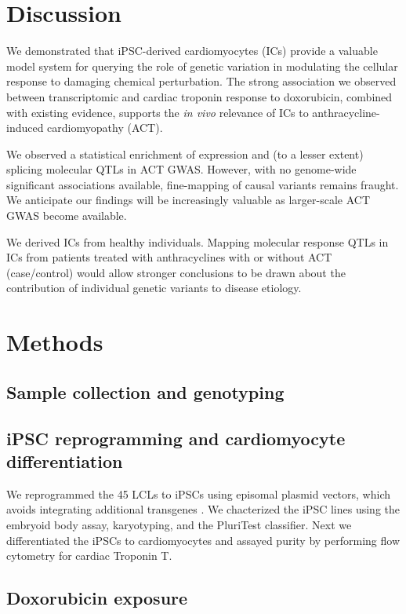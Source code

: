 \documentclass{article}
\begin{document}
{\section*{Discussion}

We demonstrated that iPSC-derived cardiomyocytes (ICs) provide a valuable model system for querying the role of genetic variation in modulating the cellular response to damaging chemical perturbation. The strong association we observed between transcriptomic and cardiac troponin response to doxorubicin, combined with existing evidence\cite{Burridge2016}, supports the \emph{in vivo} relevance of ICs to anthracycline-induced cardiomyopathy (ACT). 

We observed a statistical enrichment of expression and (to a lesser extent) splicing molecular QTLs in ACT GWAS. However, with no genome-wide significant associations available, fine-mapping of causal variants remains fraught. We anticipate our findings will be increasingly valuable as larger-scale ACT GWAS become available. 

We derived ICs from healthy individuals. Mapping molecular response QTLs in ICs from patients treated with anthracyclines with or without ACT (case/control) would allow stronger conclusions to be drawn about the contribution of individual genetic variants to disease etiology. 

\section*{Methods} 

\subsection*{Sample collection and genotyping}

\subsection*{iPSC reprogramming and cardiomyocyte differentiation} 

We reprogrammed the 45 LCLs to iPSCs using episomal plasmid vectors,
which avoids integrating additional transgenes \cite{Okita2011}. We
chacterized the iPSC lines using the embryoid body assay, karyotyping,
and the PluriTest \cite{Muller2011} classifier. Next we differentiated
the iPSCs to cardiomyocytes \cite{Lian2013, Burridge2014} and assayed
purity by performing flow cytometry for cardiac Troponin T.

\subsection*{Doxorubicin exposure}

}
\end{document}
